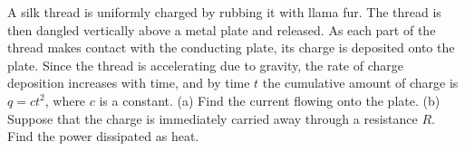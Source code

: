 A silk thread is uniformly charged by rubbing it with llama fur.
The thread is then dangled vertically above a metal plate and
released. As each part of the thread makes contact with the conducting
plate, its charge is deposited onto the plate. Since the thread is
accelerating due to gravity, the rate of charge deposition increases
with time, and by time $t$ the cumulative amount of charge is $q=ct^2$,
where $c$ is a constant. (a) Find the current flowing onto the plate.\answercheck\hwendpart
(b) Suppose that the charge is immediately carried away through a resistance $R$.
Find the power dissipated as heat.\answercheck\hwendpart

